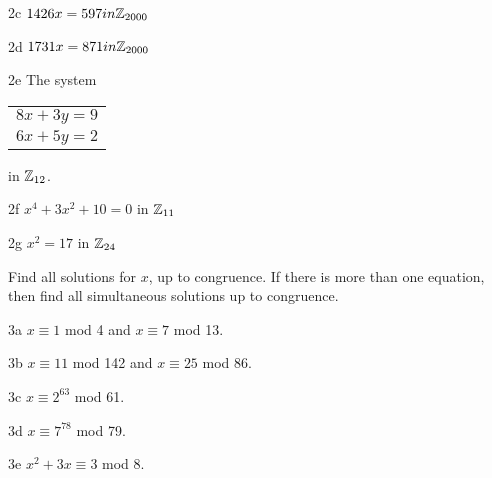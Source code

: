 \begin{question}{2c}
$1426x = 597 in \mathbb{Z}_{2000}$
\end{question}

\begin{question}{2d}
$1731x = 871 in \mathbb{Z}_{2000}$
\end{question}

\begin{question}{2e}
The system 
\begin{tabular}{l}
$8x + 3y=9$\\
$6x + 5y=2$
\end{tabular}
in $\mathbb{Z}_{12}$.

\end{question}

\begin{question}{2f}
$x^4 + 3x^2 +10 = 0$ in $\mathbb{Z}_{11}$
\end{question}

\begin{question}{2g}
$x^2 = 17$ in $\mathbb{Z}_{24}$
\end{question}



\begin{question}{3}
Find all solutions for $x$, up to congruence. If there is more than one equation, then find all simultaneous solutions up to congruence.
\end{question}


\begin{question}{3a}
$x \equiv 1$ mod 4 and $x \equiv 7$ mod 13.
\end{question}

\begin{question}{3b}
$x \equiv 11$ mod 142 and $x \equiv 25$ mod 86.
\end{question}

\begin{question}{3c}
$x \equiv 2^{63}$ mod 61.
\end{question}

\begin{question}{3d}
$x \equiv 7^{78}$ mod 79.
\end{question}

\begin{question}{3e}
$x^2 + 3x \equiv 3$ mod 8.
\end{question}


